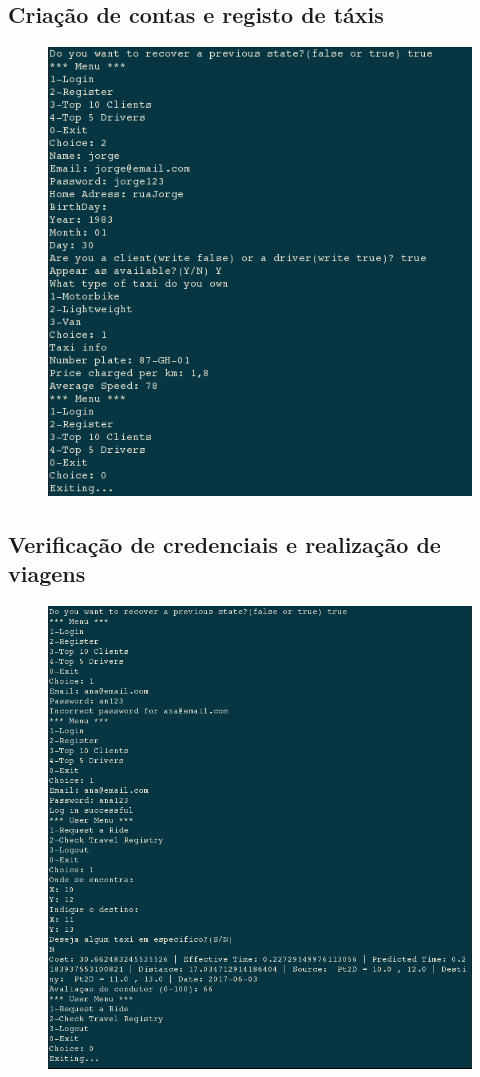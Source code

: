 \documentclass[a4paper,10pt,portuguese]{article}
\begin{document}
\subsection{Criação de contas e registo de táxis}
\begin{figure}[ht!]
    \centering
    \includegraphics[width=120mm]{registarDriver.png}
\end{figure}

\subsection{Verificação de credenciais e realização de viagens}
\begin{figure}[ht!]
    \centering
    \includegraphics[width=120mm]{fazerViagem.png}
\end{figure}
\end{document}
